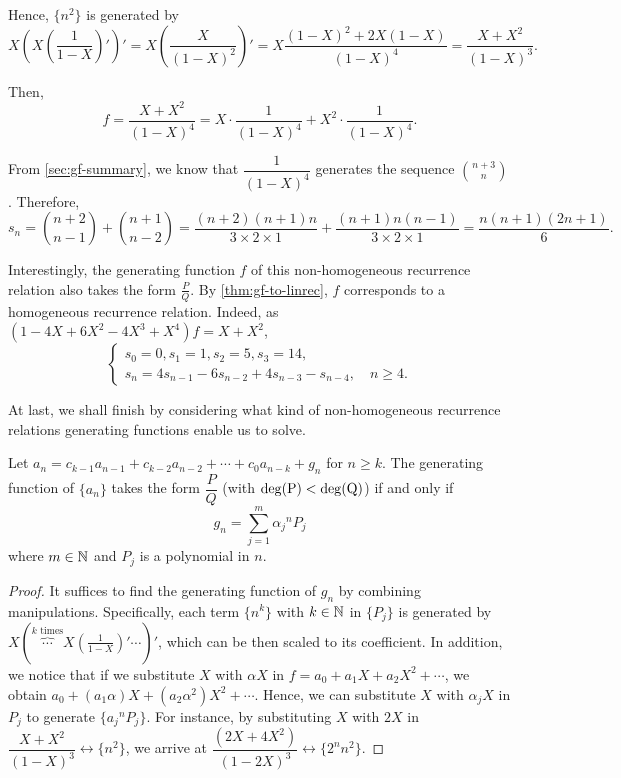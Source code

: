 \documentclass[a4paper, 12pt]{report}
\begin{document}
Hence, $\{n^2\}$ is generated by 
\[X \left(X \left(\frac{1}{1 - X}\right)'\right)' = X \left( \frac{X}{(1 - X)^2} \right)' = X \frac{(1 - X)^2 + 2 X (1 - X)}{(1 - X)^4} = \frac{X + X^2}{(1 - X)^3}.\]

Then, 
\[f = \frac{X + X^2}{(1 - X)^4} = X \cdot \frac{1}{(1 - X)^4} + X^2 \cdot \frac{1}{(1 - X)^4}.\]

From \cref{sec:gf-summary}, we know that $\dfrac{1}{(1 - X)^4}$ generates the sequence $\binom{n + 3}{n}$. Therefore,
\[s_n = \binom{n + 2}{n - 1} + \binom{n + 1}{n - 2} = \frac{(n + 2) (n + 1) n}{3 \times 2 \times 1} + \frac{(n + 1) n (n - 1)}{3 \times 2 \times 1} = \frac{n (n + 1) (2n + 1)}{6}.\]

Interestingly, the generating function $f$ of this non-homogeneous recurrence relation also takes the form $\frac{P}{Q}$. By \cref{thm:gf-to-linrec}, $f$ corresponds to a homogeneous recurrence relation. Indeed, as $(1 - 4X + 6X^2 - 4X^3 + X^4) f = X + X^2$,
\[
\begin{cases}
s_0 = 0, s_1 = 1, s_2 = 5, s_3 = 14,\\
s_n = 4s_{n - 1} - 6s_{n - 2} + 4 s_{n - 3} - s_{n - 4}, \quad n \geq 4.
\end{cases}
\]

At last, we shall finish by considering what kind of non-homogeneous recurrence relations generating functions enable us to solve.
\begin{thm}
Let $a_n = c_{k - 1}a_{n - 1} + c_{k - 2}a_{n - 2} + \cdots + c_0 a_{n - k} + g_n$ for $n \geq k$. The generating function of $\{a_n\}$ takes the form $\dfrac{P}{Q}$ (with $\rm{deg}(P) < \rm{deg}(Q)$) if and only if \[g_n = \sum_{j = 1}^{m} {\alpha_j}^n P_j\]
where $m \in \mathbb{N}$ and $P_j$ is a polynomial in $n$.
\end{thm}
\begin{proof}
It suffices to find the generating function of $g_n$ by combining manipulations. Specifically, each term $\{n^k\}$ with $k \in \mathbb{N}$ in $\{P_j\}$ is generated by $X\left(\overbrace{\cdots}^{k \text{ times}} X\left(\frac{1}{1 - X}\right)'\cdots\right)'$, which can be then scaled to its coefficient. In addition, we notice that if we substitute $X$ with $\alpha X$ in $f = a_0 + a_1 X + a_2 X^2 + \cdots$, we obtain $a_0 + (a_1 \alpha) X + (a_2 \alpha^2) X^2 + \cdots$. Hence, we can substitute $X$ with $\alpha_j X$ in $P_j$ to generate $\{{a_j}^n P_j\}$. For instance, by substituting $X$ with $2X$ in $\dfrac{X + X^2}{(1 - X)^3} \longleftrightarrow \{n^2\}$, we arrive at $\dfrac{(2X + 4X^2)}{(1 - 2X)^3} \longleftrightarrow \{2^n n^2\}$.
\end{proof}
\end{document}
